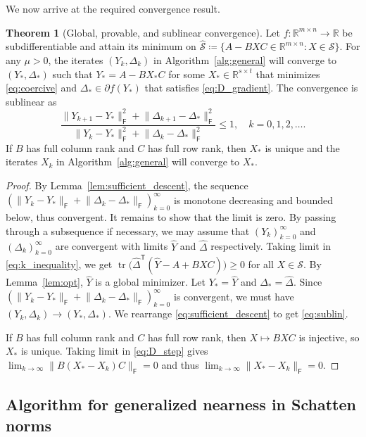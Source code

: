 \documentclass[11pt,reqno]{amsart}
\newcommand{\tp}{{\scriptscriptstyle\mathsf{T}}}
\newcommand{\F}{{\scriptscriptstyle\mathsf{F}}}
\DeclareMathOperator{\tr}{tr}
\theoremstyle{definition}
\newtheorem{theorem}{Theorem}[section]
\numberwithin{equation}{section}
\newcommand{\R}{\mathbb{R}}
\begin{document}
We now arrive at the required convergence result.
\begin{theorem}[Global, provable, and sublinear convergence]\label{thm:conv}
Let $f: \R^{m \times n} \to \R$ be subdifferentiable and attain its minimum on $\widehat{\mathcal{S}} \coloneqq \{A - BXC \in \R^{m \times n} : X \in \mathcal{S}\}$. For any $\mu > 0$, the iterates $(Y_k, \Delta_k)$ in Algorithm~\ref{alg:general} will converge to $(Y_*, \Delta_*)$ such that $Y_* = A - BX_*C$ for some $X_* \in \R^{s \times t}$ that minimizes \eqref{eq:coercive} and $\Delta_* \in \partial f(Y_*)$ that satisfies \eqref{eq:D_gradient}. The convergence is sublinear as
\begin{equation}\label{eq:sublin}
\frac{\lVert Y_{k+1} -Y_* \rVert_\F^2 + \lVert \Delta_{k+1} - \Delta_* \rVert_\F^2}{\lVert Y_k -Y_* \rVert_\F^2 + \lVert \Delta_k - \Delta_* \rVert_\F^2} \le 1, \quad k =0, 1, 2,\dots.
\end{equation}
If $B$ has full column rank and $C$ has full row rank, then $X_*$ is unique and the iterates $X_k$ in Algorithm~\ref{alg:general} will converge to $X_*$.
\end{theorem}
\begin{proof}
By Lemma~\ref{lem:sufficient_descent}, the sequence $(\lVert Y_k - Y_* \rVert_\F + \lVert \Delta_k - \Delta_* \rVert_\F)_{k=0}^\infty$ is monotone decreasing and bounded below, thus convergent. It remains to show that the limit is zero. By passing through a subsequence if necessary, we may assume that $(Y_k)_{k=0}^\infty$ and $(\Delta_k)_{k=0}^\infty$ are convergent with limits $\widehat{Y}$ and  $\widehat{\Delta}$ respectively. Taking limit in \eqref{eq:k_inequality}, we get $\tr\bigl(\widehat{\Delta}^\tp(\widehat{Y} - A + BXC) \bigr) \ge 0$ for all $X \in \mathcal{S}$.
By Lemma~\ref{lem:opt}, $\widehat{Y}$ is a global minimizer. Let $Y_* = \widehat{Y}$ and $\Delta_* = \widehat{\Delta}$. Since $(\lVert Y_k - Y_* \rVert_\F + \lVert \Delta_k - \Delta_* \rVert_\F)_{k=0}^\infty$ is convergent, we must have $(Y_k,\Delta_k) \to (Y_*, \Delta_*)$. We rearrange \eqref{eq:sufficient_descent} to get \eqref{eq:sublin}.

If $B$ has full column rank and $C$ has full row rank, then $X \mapsto BXC$ is injective, so $X_*$ is unique. Taking limit in \eqref{eq:D_step} gives
$\lim_{k\to \infty} \lVert B(X_* - X_k)C \rVert_\F = 0$ and thus $\lim_{k\to \infty} \lVert X_* - X_k\rVert_\F = 0$.
\end{proof}

\subsection{Algorithm for generalized nearness in Schatten norms}\label{sec:Schatten}
\end{document}
